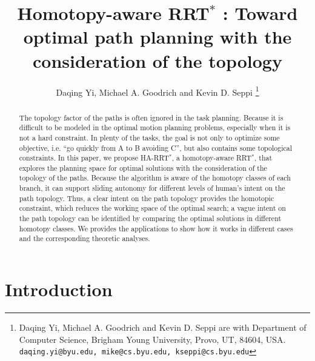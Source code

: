 \documentclass[letterpaper, 10 pt, conference]{ieeeconf}
\title{\LARGE \bf
Homotopy-aware RRT$^{*}$ : Toward optimal path planning with the consideration of the topology
}
\author{
Daqing Yi, Michael A. Goodrich and Kevin D. Seppi
\thanks{Daqing Yi, Michael A. Goodrich and Kevin D. Seppi are with Department of Computer Science, Brigham Young University, Provo, UT, 84604, USA.
{\tt\small daqing.yi@byu.edu, mike@cs.byu.edu, kseppi@cs.byu.edu} }
}
\begin{document}
\maketitle
\thispagestyle{empty}
\pagestyle{empty}


\begin{abstract}
The topology factor of the paths is often ignored in the task planning.
Because it is difficult to be modeled in the optimal motion planning problems, especially when it is not a hard constraint.
In plenty of the tasks, the goal is not only to optimize some objective, i.e. ``go quickly from A to B avoiding C'', but also contains some topological constraints.
In this paper, we propose HA-RRT$^{*}$, a homotopy-aware RRT$^{*}$, that explores the planning space for optimal solutions with the consideration of the topology of the paths.
Because the algorithm is aware of the homotopy classes of each branch, it can support sliding autonomy for different levels of human's intent on the path topology.
Thus, a clear intent on the path topology provides the homotopic constraint, which reduces the working space of the optimal search;
a vague intent on the path topology can be identified by comparing the optimal solutions in different homotopy classes.
We provides the applications to show how it works in different cases and the corresponding theoretic analyses.
\end{abstract}

\section{Introduction}
\label{sec:intro}
\end{document}
